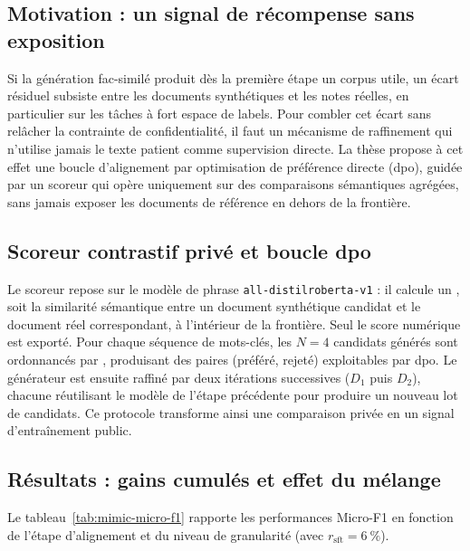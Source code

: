 
\subsection{Motivation : un signal de récompense sans exposition}

Si la génération fac-similé produit dès la première étape un corpus utile, un écart résiduel subsiste entre les documents synthétiques et les notes réelles, en particulier sur les tâches à fort espace de labels.
Pour combler cet écart sans relâcher la contrainte de confidentialité, il faut un mécanisme de raffinement qui n'utilise jamais le texte patient comme supervision directe.
La thèse propose à cet effet une boucle d'alignement par optimisation de préférence directe (\gls{dpo}), guidée par un scoreur qui opère uniquement sur des comparaisons sémantiques agrégées, sans jamais exposer les documents de référence en dehors de la frontière.

\subsection{Scoreur contrastif privé et boucle \gls{dpo}}

Le scoreur repose sur le modèle de phrase \texttt{all-distilroberta-v1} : il calcule un \score, soit la similarité sémantique entre un document synthétique candidat et le document réel correspondant, à l'intérieur de la frontière.
Seul le score numérique est exporté.
Pour chaque séquence de mots-clés, les $N=4$ candidats générés sont ordonnancés par \score, produisant des paires (préféré, rejeté) exploitables par \gls{dpo}.
Le générateur est ensuite raffiné par deux itérations successives ($D_1$ puis $D_2$), chacune réutilisant le modèle de l'étape précédente pour produire un nouveau lot de candidats.
Ce protocole transforme ainsi une comparaison privée en un signal d'entraînement public.

\subsection{Résultats : gains cumulés et effet du mélange}

Le tableau~\ref{tab:mimic-micro-f1} rapporte les performances Micro-F1 en fonction de l'étape d'alignement et du niveau de granularité (avec $r_{\text{sft}} = \SI{6}{\percent}$).

